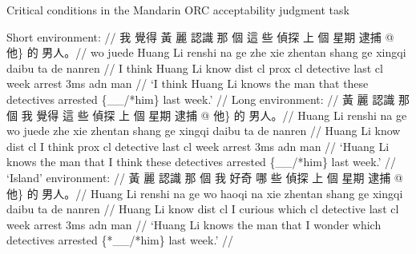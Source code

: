 \pex[everygla=\zh]
Critical conditions in the Mandarin ORC acceptability judgment task \label{ex-ajt-zh-orc}\par\nobreak
\a 
\begingl
\glpreamble Short environment: //
\gla 我 覺得 黃 麗 認識 那 個 這 些 偵探 上 個 星期 逮捕 \nogloss{\{\_\_/} @ 他\} 的 男人。// 
\glb wo juede Huang Li renshi na ge zhe xie zhentan shang ge xingqi daibu ta de nanren //
\glc I think Huang Li know {\sc dist} {\sc cl} {\sc prox} {\sc cl} detective last {\sc cl} week arrest {\sc 3ms} {\sc adn} man //
\glft `I think Huang Li knows the man that these detectives arrested \{\_\_/*him\} last week.' // 
\endgl 
\a 
\begingl
\glpreamble Long environment: //
\gla 黃 麗 認識 那 個 我 覺得 這 些 偵探 上 個 星期 逮捕 \nogloss{\{\_\_/} @ 他\} 的 男人。// 
\glb Huang Li renshi na ge wo juede zhe xie zhentan shang ge xingqi daibu ta de nanren //
\glc Huang Li know {\sc dist} {\sc cl} I think {\sc prox} {\sc cl} detective last {\sc cl} week arrest {\sc 3ms} {\sc adn} man //
\glft `Huang Li knows the man that I think these detectives arrested \{\_\_/*him\} last week.' // 
\endgl 
\a 
\begingl
\glpreamble `Island' environment:\footnotemark{} //
\gla 黃 麗 認識 那 個 我 好奇 哪 些 偵探 上 個 星期 逮捕 \nogloss{\{\_\_/} @ 他\} 的 男人。// 
\glb Huang Li renshi na ge wo haoqi na xie zhentan shang ge xingqi daibu ta de nanren //
\glc Huang Li know {\sc dist} {\sc cl} I curious which {\sc cl} detective last {\sc cl} week arrest {\sc 3ms} {\sc adn} man //
\glft `Huang Li knows the man that I wonder which detectives arrested \{*\_\_/*him\} last week.' //
\endgl 
\xe


